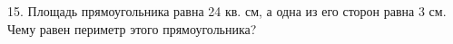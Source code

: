 15. Площадь прямоугольника равна 24 кв. см, а одна из его сторон равна 3 см. Чему равен периметр этого прямоугольника?\\
